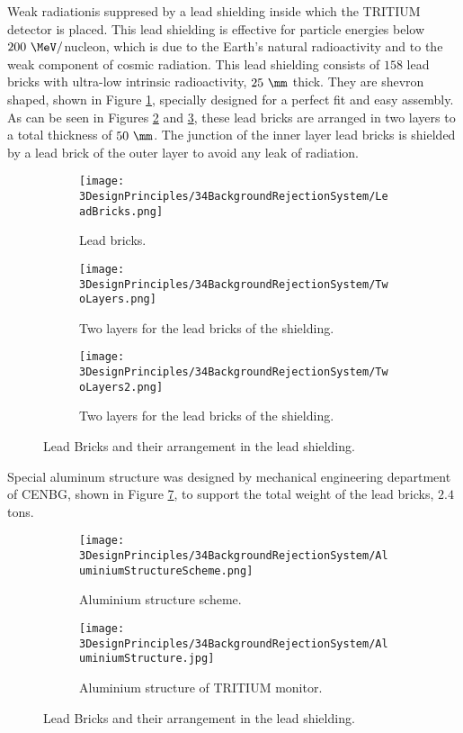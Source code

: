 Weak radiationis suppresed by a lead shielding inside which the TRITIUM detector is placed. This lead shielding is effective for particle energies below $200~\MeV/$nucleon, which is due to the Earth's natural radioactivity and to the weak component of cosmic radiation. This lead shielding consists of $158$ lead bricks with ultra-low intrinsic radioactivity, $25~\mm$ thick. They are shevron shaped, shown in Figure \ref{subfig:LeadBricks}, specially designed for a perfect fit and easy assembly. As can be seen in Figures \ref{subfig:TwoLayers} and \ref{subfig:TwoLayers2}, these lead bricks are arranged in two layers to a total thickness of $50~\mm$. The junction of the inner layer lead bricks is shielded by a lead brick of the outer layer to avoid any leak of radiation.

\begin{figure}
\centering
    \begin{subfigure}[b]{0.3\textwidth}
    \centering
    \texttt{[image: 3DesignPrinciples/34BackgroundRejectionSystem/LeadBricks.png]}  
    \caption{Lead bricks.\label{subfig:LeadBricks}}
    \end{subfigure}
    \hfill
    \begin{subfigure}[b]{0.3\textwidth}
    \centering
    \texttt{[image: 3DesignPrinciples/34BackgroundRejectionSystem/TwoLayers.png]}  
    \caption{Two layers for the lead bricks of the shielding.\label{subfig:TwoLayers}}
    \end{subfigure}
    \hfill
    \begin{subfigure}[b]{0.3\textwidth}
    \centering
    \texttt{[image: 3DesignPrinciples/34BackgroundRejectionSystem/TwoLayers2.png]}  
    \caption{Two layers for the lead bricks of the shielding.\label{subfig:TwoLayers2}}
    \end{subfigure}
 \caption{Lead Bricks and their arrangement in the lead shielding.}
 \label{fig:LeadBricksAndArrangement}
\end{figure}

Special aluminum structure was designed by mechanical engineering department of CENBG, shown in Figure \ref{fig:AluminiumStructure}, to support the total weight of the lead bricks, $2.4$ tons.

\begin{figure}
\centering
    \begin{subfigure}[b]{0.45\textwidth}
    \centering
    \texttt{[image: 3DesignPrinciples/34BackgroundRejectionSystem/AluminiumStructureScheme.png]}  
    \caption{Aluminium structure scheme.\label{subfig:AluminiumStructureScheme}}
    \end{subfigure}
    \hfill
    \begin{subfigure}[b]{0.4\textwidth}
    \centering
    \texttt{[image: 3DesignPrinciples/34BackgroundRejectionSystem/AluminiumStructure.jpg]}  
    \caption{Aluminium structure of TRITIUM monitor.\label{subfig:AluminiumStructure}}
    \end{subfigure}
    \caption{Lead Bricks and their arrangement in the lead shielding.}
 \label{fig:AluminiumStructure}
\end{figure}

